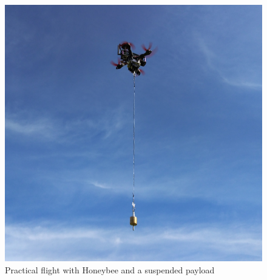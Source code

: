         \begin{figure}[!htb]
            \centering
            \includegraphics[width=0.5\linewidth]{honeybee_with_payload.jpg}
            \caption{Practical flight with Honeybee and a suspended payload}
            \label{fig:honeybee_with_payload}
        \end{figure}
        

        
